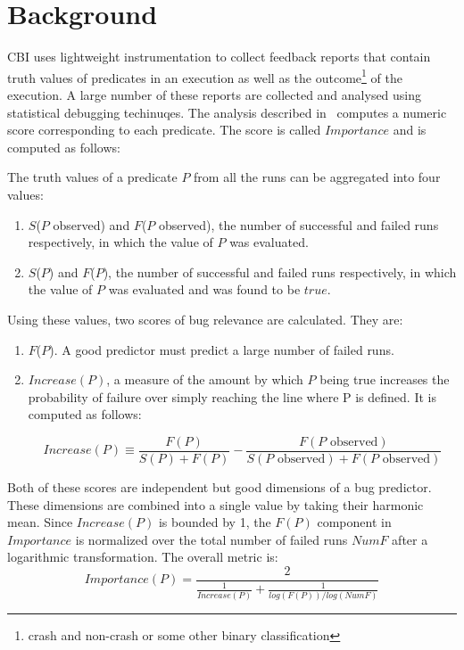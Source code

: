 \section{Background}
\label{sec-bground}
CBI uses lightweight instrumentation to collect feedback reports that contain truth values of predicates in an execution as well as the outcome{\footnote{crash and non-crash or some other binary classification}} of the execution.  A large number of these reports are collected and analysed using statistical debugging techinuqes.  The analysis described in~\cite{Liblit:2005:SSBI} computes a numeric score corresponding to each predicate.  The score is called $Importance$ and is computed as follows:

The truth values of a predicate $P$ from all the runs can be aggregated into four values:

\begin{enumerate}
\item $S$($P$ observed) and $F$($P$ observed), the number of successful and failed runs respectively, in which the value of $P$ was evaluated.
\item $S$($P$) and $F$($P$), the number of successful and failed runs respectively, in which the value of $P$ was evaluated and was found to be $true$.
\end{enumerate}

Using these values, two scores of bug relevance are calculated.  They are:
\begin{enumerate}
\item $F$($P$).  A good predictor must predict a large number of failed runs.
\item $Increase(P)$, a measure of the amount by which $P$ being true increases the probability of failure over simply reaching the line where P is defined.  It is computed as follows:

\begin{equation}
\label{eqn1}
Increase(P) \equiv 
\frac{F(P)}{S(P) + F(P)}
-
\frac{F(\text{$P$ observed})}{S(\text{$P$ observed}) +
  F(\text{$P$ observed})}
\end{equation}
\end{enumerate}

Both of these scores are independent but good dimensions of a bug predictor.  These dimensions are combined into a single value by taking their harmonic mean.  Since $Increase(P)$ is bounded by 1, the $F(P)$ component in $Importance$ is normalized over the total number of failed runs $NumF$ after a logarithmic transformation.  The overall metric is:
\begin{equation}
\label{eqn2}
Importance(P) =
\frac{2}{
  \frac{1}{Increase(P)}
  +
  \frac{1}{log(F(P)) / log(NumF)}}
\end{equation}

